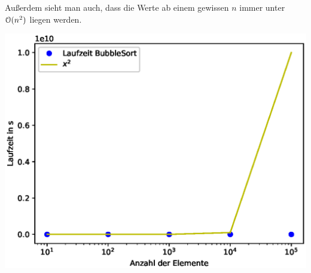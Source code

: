\documentclass[a4paper,oneside,11pt]{scrartcl}
\begin{document}
Außerdem sieht man auch, dass die Werte ab einem gewissen $n$ immer unter $\mathcal{O}(n^2)$ liegen werden.
\begin{minipage}[t][4cm][t]{0.49 \textwidth}
\centering
\includegraphics[scale=0.55]{./graphs/laufzeit_1.eps}
\end{minipage}
\end{document}
